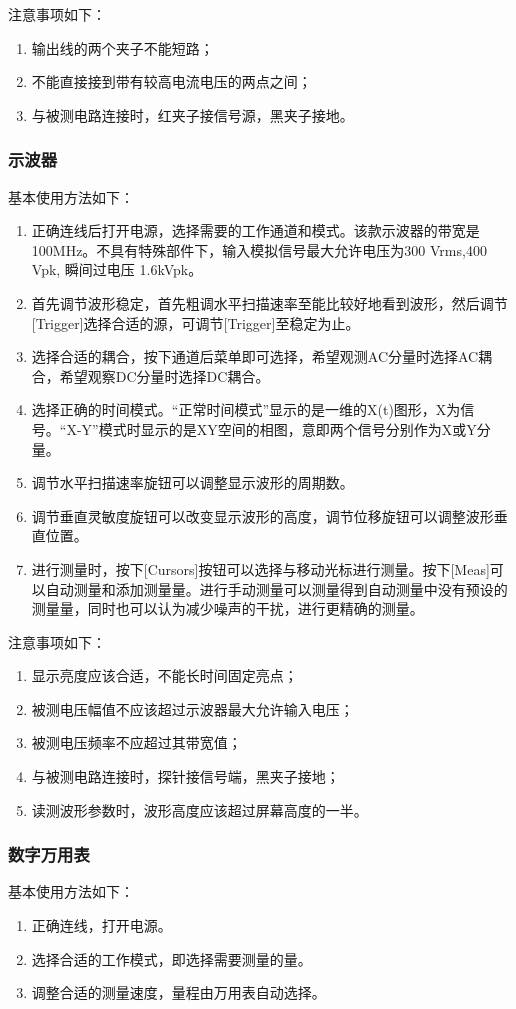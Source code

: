 \documentclass[a4paper,11pt,UTF8]{ctexart}
\begin{document}
注意事项如下：
\begin{enumerate}
  \item 输出线的两个夹子不能短路；
  \item 不能直接接到带有较高电流电压的两点之间；
  \item 与被测电路连接时，红夹子接信号源，黑夹子接地。
\end{enumerate}
\subsubsection{示波器}
基本使用方法如下：
\begin{enumerate}
  \item 正确连线后打开电源，选择需要的工作通道和模式。该款示波器的带宽是100MHz。不具有特殊部件下，输入模拟信号最大允许电压为300 Vrms,400 Vpk, 瞬间过电压 1.6kVpk。
  \item 首先调节波形稳定，首先粗调水平扫描速率至能比较好地看到波形，然后调节[Trigger]选择合适的源，可调节[Trigger]至稳定为止。
  \item 选择合适的耦合，按下通道后菜单即可选择，希望观测AC分量时选择AC耦合，希望观察DC分量时选择DC耦合。
  \item 选择正确的时间模式。“正常时间模式”显示的是一维的X(t)图形，X为信号。“X-Y”模式时显示的是XY空间的相图，意即两个信号分别作为X或Y分量。
  \item 调节水平扫描速率旋钮可以调整显示波形的周期数。
  \item 调节垂直灵敏度旋钮可以改变显示波形的高度，调节位移旋钮可以调整波形垂直位置。
  \item 进行测量时，按下[Cursors]按钮可以选择与移动光标进行测量。按下[Meas]可以自动测量和添加测量量。进行手动测量可以测量得到自动测量中没有预设的测量量，同时也可以认为减少噪声的干扰，进行更精确的测量。
\end{enumerate}

注意事项如下：
\begin{enumerate}
  \item 显示亮度应该合适，不能长时间固定亮点；
  \item 被测电压幅值不应该超过示波器最大允许输入电压；
  \item 被测电压频率不应超过其带宽值；
  \item 与被测电路连接时，探针接信号端，黑夹子接地；
  \item 读测波形参数时，波形高度应该超过屏幕高度的一半。
\end{enumerate}

\subsubsection{数字万用表}
基本使用方法如下：
\begin{enumerate}
  \item 正确连线，打开电源。
  \item 选择合适的工作模式，即选择需要测量的量。
  \item 调整合适的测量速度，量程由万用表自动选择。
\end{enumerate}
\end{document}
